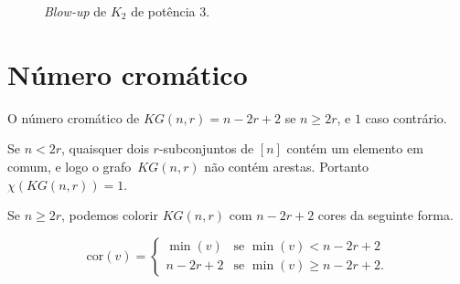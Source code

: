 \begin{figure}[H]
\centering
{}
\caption{\textit{Blow-up} de $K_2$ de potência $3$.}
\label{fig:kneserblowup}
\end{figure}

\section{Número cromático}

\begin{afirmacao}\label{kneseraffchromatic}
O número cromático de $KG(n,r) = n-2r+2$ se $n\geq 2r$, e $1$ caso contrário.
\end{afirmacao}

Se $n < 2r$, quaisquer dois $r$-subconjuntos de $[n]$ contém um elemento em comum, e logo o grafo~$KG(n,r)$ não contém arestas. Portanto $\chi(KG(n,r)) = 1$.

Se $n\geq 2r$, podemos colorir $KG(n,r)$ com $n-2r+2$ cores da seguinte forma. %

\[ \text{cor}(v) = \begin{cases} 
      \min(v) & \text{se } \min(v) < n-2r+2\\
      n-2r+2 & \text{se } \min(v) \geq n-2r+2.
   \end{cases}
\]


